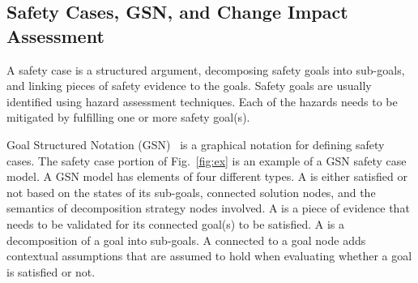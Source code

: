 \subsection{Safety Cases, GSN, and Change Impact Assessment}
\vspace{-0.1in}
A safety case is a structured argument, decomposing safety goals into sub-goals, and linking pieces of safety evidence to the goals. Safety goals are usually identified using hazard assessment techniques. Each of the hazards needs to be mitigated by fulfilling one or more safety goal(s).

Goal Structured Notation (GSN)~\cite{Kelly:2004} is a graphical notation for defining safety cases. The safety case portion of Fig.~\ref{fig:ex} is an example of a GSN safety case model. A GSN model has elements of four different types. %
A  is either satisfied or not based on the states of its sub-goals, connected solution nodes, and the semantics of decomposition strategy nodes involved. A  is a piece of evidence that needs to be validated for its connected goal(s) to be satisfied. A  is a decomposition of a goal into sub-goals. A  connected to a goal node adds contextual assumptions that are assumed to hold when evaluating whether a goal is satisfied or not.


